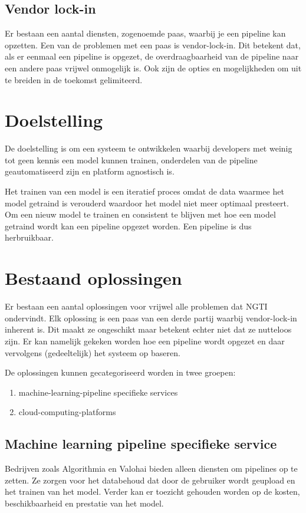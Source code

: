 \subsection{Vendor lock-in}\label{sec:vendor-lock-in}
Er bestaan een aantal diensten, zogenoemde \acrfull{paas}, waarbij je een pipeline kan opzetten. Een van de problemen met een \acrshort{paas} is \gls{vendor-lock-in}. Dit betekent dat, als er eenmaal een pipeline is opgezet, de overdraagbaarheid van de pipeline naar een andere \acrshort{paas} vrijwel onmogelijk is. Ook zijn de opties en mogelijkheden om uit te breiden in de toekomst gelimiteerd.

\section{Doelstelling}\label{sec:doelstelling}
De doelstelling is om een systeem te ontwikkelen waarbij developers met weinig tot geen kennis een model kunnen trainen, onderdelen van de pipeline geautomatiseerd zijn en platform agnostisch is.

Het trainen van een model is een iteratief proces omdat de data waarmee het model getraind is verouderd waardoor het model niet meer optimaal presteert. Om een nieuw model te trainen en consistent te blijven met hoe een model getraind wordt kan een pipeline opgezet worden. Een pipeline is dus herbruikbaar.

\section{Bestaand oplossingen}\label{sec:bestaande-oplossingen}
Er bestaan een aantal oplossingen voor vrijwel alle problemen dat NGTI ondervindt. Elk oplossing is een \acrshort{paas} van een derde partij waarbij \gls{vendor-lock-in} inherent is. Dit maakt ze ongeschikt maar betekent echter niet dat ze nutteloos zijn. Er kan namelijk gekeken worden hoe een pipeline wordt opgezet en daar vervolgens (gedeeltelijk) het systeem op baseren.

De oplossingen kunnen gecategoriseerd worden in twee groepen:
\begin{enumerate}
  \item \Gls{machine-learning-pipeline} specifieke services
  \item \Glspl{cloud-computing-platform}
\end{enumerate}

\subsection{Machine learning pipeline specifieke service}\label{subsec:machine-learning-pipeline-specifieke-service}
Bedrijven zoals Algorithmia \cite{algorithmia-website} en Valohai \cite{valohai-website} bieden alleen diensten om pipelines op te zetten. Ze zorgen voor het databehoud dat door de gebruiker wordt geupload en het trainen van het model. Verder kan er toezicht gehouden worden op de kosten, beschikbaarheid en prestatie van het model.

